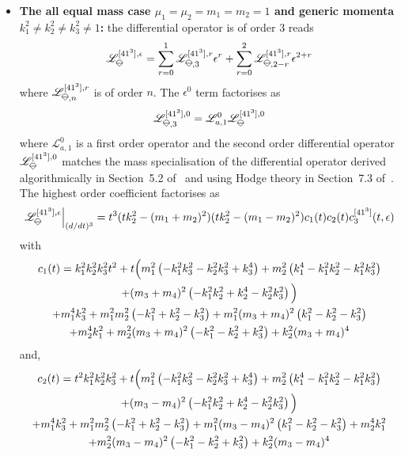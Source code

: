 \documentclass[a4paper,12pt]{article}
\numberwithin{equation}{section}
\numberwithin{figure}{section}
\newcommand{\IceCream}{	\begin{tikzpicture}[scale=0.05]
	\draw[color = black, fill=none] (2,0) arc(0:180:2);
		\draw [black] (-2,0) to (2,0);
		\draw [black] (-2,0) to (0,-2);
                	\draw [black] (2,0) to (0,-2);
	\end{tikzpicture}}
\begin{document}
\begin{itemize}
	
	\item \textbf{ The all equal mass case
		$\mu_1=\mu_2=m_1=m_2=1$ and generic momenta $k_1^2\neq
                k_2^2\neq
		k_3^2\neq 1$:} the differential operator is of order 3
	reads
	\begin{equation}
		\mathscr{L}_{\IceCream}^{[41^3],\epsilon}=\sum_{r=0}^1
		\mathscr{L}_{\IceCream,3}^{[41^3],r} \epsilon^r+ \sum_{r=0}^2   \mathscr{L}_{\IceCream,2-r}^{[41^3],r} \epsilon^{2+r}
	\end{equation}
	where $ \mathscr{L}_{\IceCream,n}^{[41^3],r}$  is of order $n$. The
	$\epsilon^0$ term factorises as
	\begin{equation}
		\mathscr{L}_{\IceCream,3}^{[41^3],0}=\mathscr{L}_{a,1}^0 \mathscr{L}_{\IceCream}^{[41^3],0}      
	\end{equation}
	where $\mathscr{L}_{a,1}^0$ is a first order operator   and the second order
	differential operator  $\mathscr{L}_{\IceCream}^{[41^3] ,0}
	$ matches the mass specialisation of the differential
	operator derived algorithmically in Section~5.2
	of~\cite{Lairez:2022zkj} and using Hodge theory in
	Section~7.3 of~\cite{Doran:2023yzu}.
	The highest order coefficient factorises as
	\begin{equation}
		\mathscr{L}_{\IceCream}^{[41^3],\epsilon}\Big|_{(d/dt)^3}=t^3(tk_2^2-(m_1+m_2)^2)(tk_2^2-(m_1-m_2)^2) c_1(t) c_2(t)c^{[41^3]}_3(t,\epsilon)   
	\end{equation}
	with
	\begin{multline}
		c_1(t)=   k_{1}^2 k_{2}^2 k_{3}^2 t^2 +t\Big(m_{1}^2 \left(-k_{1}^2 k_{3}^2-k_{2}^2 k_{3}^2+k_{3}^4\right)+m_{2}^2 \left(k_{1}^4-k_{1}^2
		k_{2}^2-k_{1}^2 k_{3}^2\right)\cr+(m_{3}+m_{4})^2
		\left(-k_{1}^2 k_{2}^2+k_{2}^4-k_{2}^2
		k_{3}^2\right)\Big)\cr
		+m_{1}^4 k_{3}^2+m_{1}^2 m_{2}^2 \left(-k_{1}^2+k_{2}^2-k_{3}^2\right)+m_{1}^2 (m_{3}+m_{4})^2
		\left(k_{1}^2-k_{2}^2-k_{3}^2\right)\cr+m_{2}^4 k_{1}^2+m_{2}^2 (m_{3}+m_{4})^2
		\left(-k_{1}^2-k_{2}^2+k_{3}^2\right)+k_{2}^2 (m_{3}+m_{4})^4
	\end{multline}
	and,
	\begin{multline}
		c_2(t)=t^2 k_{1}^2 k_{2}^2 k_{3}^2+t\Big(m_{1}^2 \left(-k_{1}^2 k_{3}^2-k_{2}^2 k_{3}^2+k_{3}^4\right)+m_{2}^2 \left(k_{1}^4-k_{1}^2
		k_{2}^2-k_{1}^2 k_{3}^2\right)\cr+(m_{3}-m_{4})^2 \left(-k_{1}^2 k_{2}^2+k_{2}^4-k_{2}^2 k_{3}^2\right)\Big)\cr
		+m_{1}^4 k_{3}^2+m_{1}^2 m_{2}^2 \left(-k_{1}^2+k_{2}^2-k_{3}^2\right)+m_{1}^2 (m_{3}-m_{4})^2
		\left(k_{1}^2-k_{2}^2-k_{3}^2\right)+m_{2}^4 k_{1}^2\cr+m_{2}^2 (m_{3}-m_{4})^2
		\left(-k_{1}^2-k_{2}^2+k_{3}^2\right)+k_{2}^2 (m_{3}-m_{4})^4

\end{multline}
\end{itemize}
\end{document}
